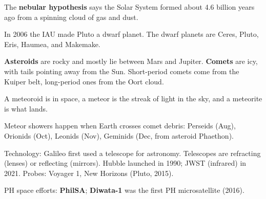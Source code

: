 \begin{gradebody}
\kf
\begin{keyfacts}
\item The \textbf{nebular hypothesis} says the Solar System formed about 4.6 billion years ago from a spinning cloud of gas and dust.
\item In 2006 the IAU made Pluto a dwarf planet. The dwarf planets are Ceres, Pluto, Eris, Haumea, and Makemake.
\item \textbf{Asteroids} are rocky and mostly lie between Mars and Jupiter. \textbf{Comets} are icy, with tails pointing away from the Sun. Short-period comets come from the Kuiper belt, long-period ones from the Oort cloud.
\item A meteoroid is in space, a meteor is the streak of light in the sky, and a meteorite is what lands.
\item Meteor showers happen when Earth crosses comet debris: Perseids (Aug), Orionids (Oct), Leonids (Nov), Geminids (Dec, from asteroid Phaethon).
\item Technology: Galileo first used a telescope for astronomy. Telescopes are refracting (lenses) or reflecting (mirrors). Hubble launched in 1990; JWST (infrared) in 2021. Probes: Voyager 1, New Horizons (Pluto, 2015).
\item PH space efforts: \textbf{PhilSA}; \textbf{Diwata-1} was the first PH microsatellite (2016).
\end{keyfacts}
\cards
{}

\end{gradebody}
